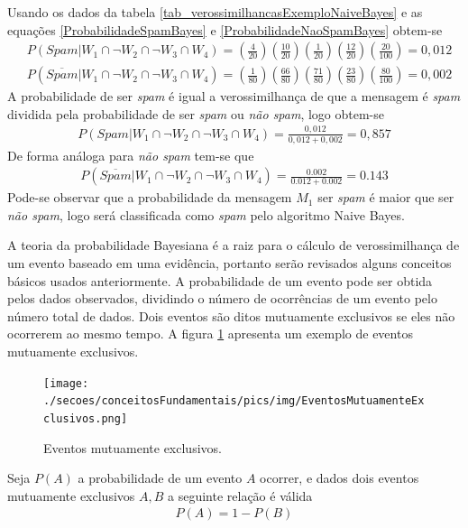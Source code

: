 \noindent
Usando os dados da tabela \ref{tab_verossimilhancasExemploNaiveBayes} e as equações \eqref{ProbabilidadeSpamBayes} e \eqref{ProbabilidadeNaoSpamBayes} obtem-se
\begin{align}
& P(Spam|W_{1} \cap \neg W_{2} \cap \neg W_{3} \cap W_{4}) = \left(\frac{4}{20}\right) \left(\frac{10}{20}\right) \left(\frac{1}{20}\right) \left(\frac{12}{20}\right) \left(\frac{20}{100}\right) = 0,012 \\
& P(\overline{Spam}|W_{1} \cap \neg W_{2} \cap \neg W_{3} \cap W_{4}) = \left(\frac{1}{80}\right) \left(\frac{66}{80}\right) \left(\frac{71}{80}\right) \left(\frac{23}{80}\right) \left(\frac{80}{100}\right) = 0,002
\end{align}
A probabilidade de ser \emph{spam} é igual a verossimilhança de que a mensagem é \emph{spam} dividida pela probabilidade de ser \emph{spam} ou \emph{não spam}, logo obtem-se
\begin{align}
P(Spam|W_{1} \cap \neg W_{2} \cap \neg W_{3} \cap W_{4}) = \frac{0,012}{0,012 + 0,002} = 0,857
\end{align}
De forma análoga para \emph{não spam} tem-se que
\begin{align}
P(\overline{Spam}|W_{1} \cap \neg W_{2} \cap \neg W_{3} \cap W_{4}) = \frac{0.002}{0.012 + 0.002} = 0.143 
\end{align}
Pode-se observar que a probabilidade da mensagem \(M_{1}\) ser \emph{spam} é maior que ser \emph{não spam}, logo será classificada como \emph{spam} pelo algoritmo Naive Bayes.

A teoria da probabilidade Bayesiana é a raiz para o cálculo de verossimilhança de um evento baseado em uma evidência, portanto serão revisados alguns conceitos básicos usados anteriormente. A probabilidade de um evento pode ser obtida pelos dados observados, dividindo o número de ocorrências de um evento pelo número total de dados. Dois eventos são ditos mutuamente exclusivos se eles não ocorrerem ao mesmo tempo. A figura \ref{FIGURA_EVENTOS_MUTUAMENTE_EXCLUSIVOS} apresenta um exemplo de eventos mutuamente exclusivos.
\begin{figure}[hbt]
	\centering
 	  \caption{Eventos mutuamente exclusivos.}
		\texttt{[image: ./secoes/conceitosFundamentais/pics/img/EventosMutuamenteExclusivos.png]}
	\label{FIGURA_EVENTOS_MUTUAMENTE_EXCLUSIVOS}
\end{figure}
Seja \(P(A)\) a probabilidade de um evento \(A\) ocorrer, e dados dois eventos mutuamente exclusivos \(A, B\) a seguinte relação é válida
\begin{align}
P(A) = 1 - P(B)
\end{align}

